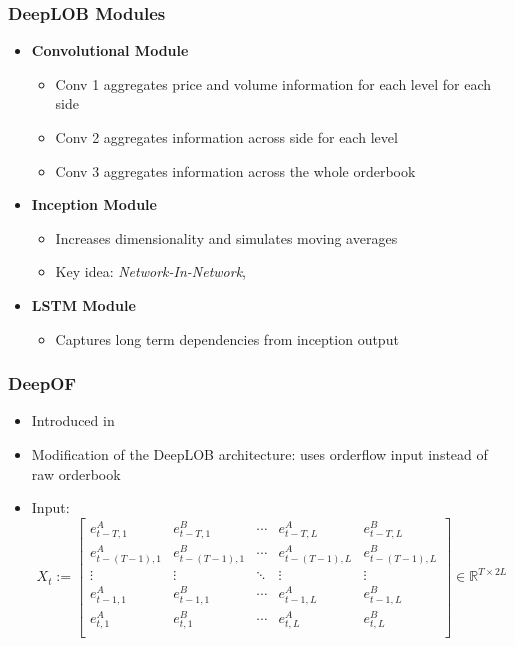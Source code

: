 \documentclass[handout]{beamer}
\begin{document}
\begin{frame}
    \frametitle{DeepLOB Modules}
     \begin{itemize}
        \item \textbf{Convolutional Module}
             \begin{itemize}
                \item Conv 1 aggregates price and volume information for each level for each side
                \item Conv 2 aggregates information across side for each level
                \item Conv 3 aggregates information across the whole orderbook
            \end{itemize}
        \item \textbf{Inception Module}
             \begin{itemize}
                 \item Increases dimensionality and simulates moving averages
                 \item Key idea: \textit{Network-In-Network}, {\color{blue}\cite{MIN2014}}
            \end{itemize}
        \item \textbf{LSTM Module}
             \begin{itemize}
                 \item Captures long term dependencies from inception output
            \end{itemize}
    \end{itemize}
\end{frame}


\begin{frame}
    \frametitle{DeepOF}
     \begin{itemize}
         \item Introduced in {\color{blue}\cite{KOLM2023}}
        \item Modification of the DeepLOB architecture: uses orderflow input instead of raw orderbook
        \item Input:
            \small
            \begin{equation*}
                X_{t} := \begin{bmatrix}
                e_{t-T, 1}^A & e_{t-T, 1}^B &   \cdots & e_{t-T, L}^A & e_{t-T, L}^B \\
                e_{t-(T-1), 1}^A & e_{t-(T-1), 1}^B &   \cdots & e_{t-(T-1), L}^A & e_{t-(T-1), L}^B \\
                \vdots & \vdots & \ddots & \vdots & \vdots \\
                e_{t-1, 1}^A & e_{t-1, 1}^B &  \cdots & e_{t-1, L}^A & e_{t-1, L}^B \\
                e_{t, 1}^A & e_{t, 1}^B &  \cdots & e_{t, L}^A & e_{t, L}^B \\
                \end{bmatrix} \in \mathbb{R}^{T \times 2L}
                \label{DeepLOB_input}
            \end{equation*}
    \end{itemize}
\end{frame}
\end{document}
